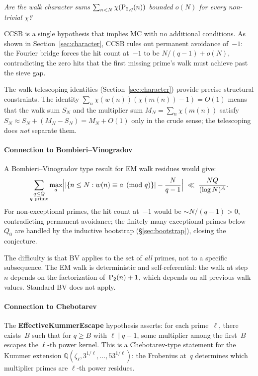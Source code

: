 \begin{center}
\emph{Are the walk character sums $\sum_{n<N} \chi(\mathrm{P}_{2,q}(n))$ bounded
$o(N)$ for every non-trivial $\chi$?}
\end{center}

CCSB is a single hypothesis that implies MC with no additional
conditions.  As shown in Section~\ref{sec:character}, CCSB rules out
permanent avoidance of~$-1$: the Fourier bridge forces the hit count
at~$-1$ to be $N/(q{-}1) + o(N)$, contradicting the zero hits that
the first missing prime's walk must achieve past the sieve gap.

The walk telescoping identities (Section~\ref{sec:character}) provide
precise structural constraints.  The identity
$\sum_n \chi(w(n))(\chi(m(n))-1) = O(1)$ means that the walk sum
$S_N$ and the multiplier sum $M_N = \sum_n \chi(m(n))$ satisfy
$S_N \approx S_N + (M_N - S_N) = M_N + O(1)$ only in the crude sense;
the telescoping does \emph{not} separate them.

\paragraph{Connection to Bombieri--Vinogradov}

A Bombieri--Vinogradov type result for EM walk residues would give:
\[
\sum_{\substack{q \leq Q \\ q\text{ prime}}}
\max_{a}
\Bigl| |\{n \leq N : w(n) \equiv a \pmod{q}\}|
  - \frac{N}{q-1} \Bigr|
\;\ll\; \frac{NQ}{(\log N)^A}.
\]
For non-exceptional primes, the hit count at~$-1$ would be
$\sim N/(q{-}1) > 0$, contradicting permanent avoidance; the finitely
many exceptional primes below~$Q_0$ are handled by the inductive
bootstrap (\S\ref{sec:bootstrap}), closing the conjecture.

The difficulty is that BV applies to the set of \emph{all} primes,
not to a specific subsequence.  The EM walk is deterministic and
self-referential: the walk at step~$n$ depends on the factorization
of~$\mathrm{P}_{2}(n)+1$, which depends on all previous walk values.  Standard
BV does not apply.

\paragraph{Connection to Chebotarev}

The \textbf{EffectiveKummerEscape} hypothesis asserts: for each
prime~$\ell$, there exists~$B$ such that for $q \geq B$ with
$\ell \mid q\!-\!1$, some multiplier among the first~$B$ escapes the
$\ell$-th power kernel.  This is a Chebotarev-type statement for the
Kummer extension $\mathbb{Q}(\zeta_\ell, 3^{1/\ell}, \ldots,
53^{1/\ell})$: the Frobenius at~$q$ determines which multiplier
primes are $\ell$-th power residues.

